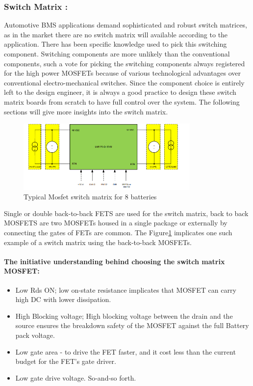 \subsubsection{Switch Matrix :}
Automotive BMS applications demand sophisticated and robust switch matrices, as in the market there are no switch matrix will available according to the application. There has been specific knowledge used to pick this switching component. Switching components are more unlikely than the conventional components, such a vote for picking the switching components always registered for the high power MOSFETs because of various technological advantages over conventional electro-mechanical switches. Since the component choice is entirely left to the design engineer, it is always a good practice to design these switch matrix boards from scratch to have full control over the system. The following sections will give more insights into the switch matrix.
\begin{figure}[h]
	\centering
	\includegraphics[width=0.8\textwidth]{Chap04/Figures/DC_DC_Converter_bench_setup.PNG}
	\caption{Typical Mosfet switch matrix for 8 batteries \cite{Active_Balancing_Thesis_Raber} }
	\label{fig:Mosfet_Switch_Matrix}
\end{figure}
\indent Single or double back-to-back FETS are used for the switch matrix, back to back MOSFETS are two MOSFETs housed in a single package or externally by connecting the gates of FETs are common. The Figure\ref{fig:Mosfet_Switch_Matrix} implicates one such example of a switch matrix using the back-to-back MOSFETs.

\paragraph{The initiative understanding behind choosing the switch matrix MOSFET:}
\begin{itemize}
    \item Low Rds ON; low on-state resistance implicates that MOSFET can carry high DC with lower dissipation.
    \item High Blocking voltage; High blocking voltage between the drain and the source ensures the breakdown safety of the MOSFET against the full Battery pack voltage.
    \item Low gate area - to drive the FET faster, and it cost less than the current budget for the FET's gate driver.
    \item Low gate drive voltage. So-and-so forth.
\end{itemize}

